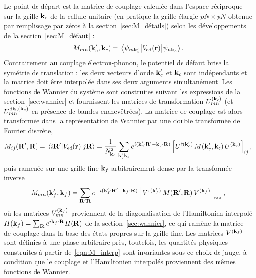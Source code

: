 Le point de départ est la matrice de couplage calculée dans l'espace
réciproque sur la grille $\mathbf{k}_c$ de la cellule unitaire (en pratique la grille
élargie $pN\times pN$ obtenue par remplissage par zéros à la
section~\ref{sec:M_détails}) selon
les développements de la section~\ref{sec:M_défaut} :
\begin{equation}
    M_{mn}(\kv_c',\kv_c) = \matrixel{\psi_{m\kv_c'}}{V_\text{ed}(\rv)}{\psi_{n\kv_c}}.
\end{equation}
Contrairement au couplage électron-phonon, le potentiel de défaut brise la symétrie de translation : les deux vecteurs d'onde $\mathbf{k}_c'$ et
$\mathbf{k}_c$ sont indépendants et la matrice doit être interpolée dans ses
deux arguments simultanément. Les fonctions de Wannier du système sont construites suivant les expressions de la section~\ref{sec:wannier} et fournissent les matrices de transformation $U^{(\mathbf{k}_c)}_{mn}$ (et $U^{\text{dis},(\mathbf{k}_c)}_{mn}$ en présence de
bandes enchevêtrées). La matrice de couplage est alors transformée dans
la représentation de Wannier par une double transformée de Fourier
discrète,
\begin{equation}
    M_{ij}(\Rv',\Rv) = \matrixel{i\Rv'}{V_\text{ed}(\rv)}{j\Rv}
    = \frac{1}{N_{\kv_c}^2}\sum_{\kv_c'\kv_c}
    e^{i(\kv_c'\cdot\Rv'-\kv_c\cdot\Rv)}
    \left[U^{\dag(\kv_c')}\,M(\kv_c',\kv_c)\,U^{(\kv_c)}\right]_{ij},
    \label{eqn:M_wannier}
\end{equation}
puis ramenée sur une grille fine $\mathbf{k}_f$ arbitrairement dense par la transformée inverse
\begin{equation}
    M_{mn}(\mathbf{k}_f',\mathbf{k}_f) = \sum_{\mathbf{R}'\mathbf{R}}
    e^{-i(\mathbf{k}_f'\cdot\mathbf{R}'-\mathbf{k}_f\cdot\mathbf{R})}
    \left[V^{\dag(\mathbf{k}_f')}\,M(\mathbf{R}',\mathbf{R})\,V^{(\mathbf{k}_f)}\right]_{mn},
    \label{eqn:M_interp}
\end{equation}
où les matrices $V^{(\mathbf{k}_f)}_{mn}$ proviennent de la diagonalisation de l'Hamiltonien interpolé $H(\mathbf{k}_f) = \sum_{\mathbf{R}} e^{i\mathbf{k}_f\cdot\mathbf{R}} H(\mathbf{R})$ de la section~\ref{sec:wannier}, ce qui ramène la matrice de couplage dans la base des états propres sur la grille fine. Les matrices $V^{(\mathbf{k}_f)}$ sont définies à une phase arbitraire près, toutefois, les quantités physiques construites à partir de~\eqref{eqn:M_interp} sont invariantes sous ce
choix de jauge, à condition que le couplage et l'Hamiltonien interpolés
proviennent des mêmes fonctions de Wannier.

